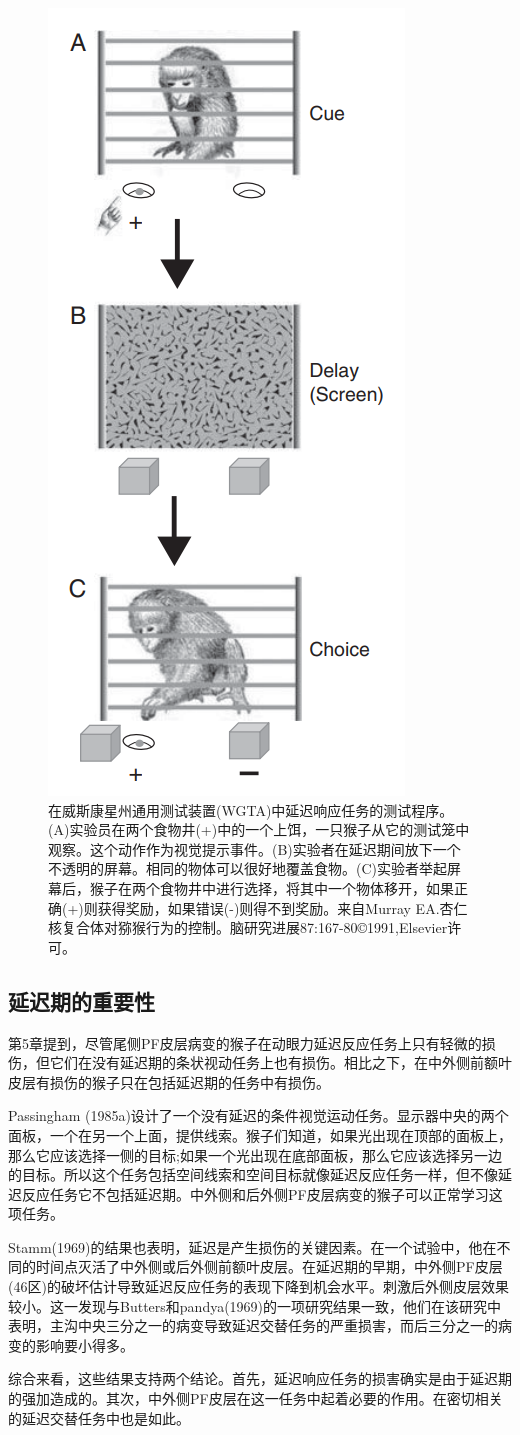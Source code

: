 \begin{figure}
	\centering
	\includegraphics[width=0.2\linewidth]{image_pfc/Fig_6_3}
	\caption{在威斯康星州通用测试装置(WGTA)中延迟响应任务的测试程序。(A)实验员在两个食物井(+)中的一个上饵，一只猴子从它的测试笼中观察。这个动作作为视觉提示事件。(B)实验者在延迟期间放下一个不透明的屏幕。相同的物体可以很好地覆盖食物。(C)实验者举起屏幕后，猴子在两个食物井中进行选择，将其中一个物体移开，如果正确(+)则获得奖励，如果错误(-)则得不到奖励。来自Murray EA.杏仁核复合体对猕猴行为的控制。脑研究进展87:167-80©1991,Elsevier许可。}
	\label{fig:fig}
\end{figure}
\subsection{延迟期的重要性}
第5章提到，尽管尾侧PF皮层病变的猴子在动眼力延迟反应任务上只有轻微的损伤，但它们在没有延迟期的条状视动任务上也有损伤。相比之下，在中外侧前额叶皮层有损伤的猴子只在包括延迟期的任务中有损伤。

Passingham (1985a)设计了一个没有延迟的条件视觉运动任务。显示器中央的两个面板，一个在另一个上面，提供线索。猴子们知道，如果光出现在顶部的面板上，那么它应该选择一侧的目标;如果一个光出现在底部面板，那么它应该选择另一边的目标。所以这个任务包括空间线索和空间目标就像延迟反应任务一样，但不像延迟反应任务它不包括延迟期。中外侧和后外侧PF皮层病变的猴子可以正常学习这项任务。

Stamm(1969)的结果也表明，延迟是产生损伤的关键因素。在一个试验中，他在不同的时间点灭活了中外侧或后外侧前额叶皮层。在延迟期的早期，中外侧PF皮层(46区)的破坏估计导致延迟反应任务的表现下降到机会水平。刺激后外侧皮层效果较小。这一发现与Butters和pandya(1969)的一项研究结果一致，他们在该研究中表明，主沟中央三分之一的病变导致延迟交替任务的严重损害，而后三分之一的病变的影响要小得多。

综合来看，这些结果支持两个结论。首先，延迟响应任务的损害确实是由于延迟期的强加造成的。其次，中外侧PF皮层在这一任务中起着必要的作用。在密切相关的延迟交替任务中也是如此。
